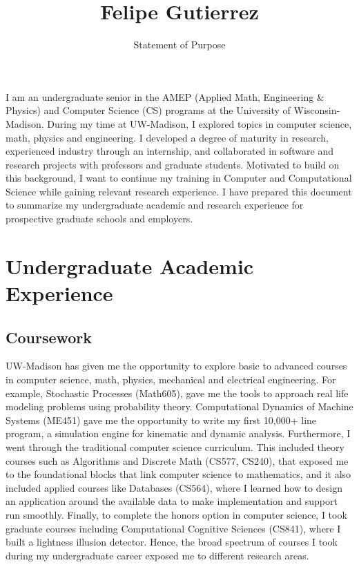 \documentclass{article}
\title{Felipe Gutierrez}
\date{}
\author{Statement of Purpose}
\theoremstyle{definition}
\begin{document}
\maketitle 

I am an undergraduate senior in the AMEP (Applied Math, Engineering \& Physics) and Computer Science (CS) programs at the University of Wisconsin-Madison. During my time at UW-Madison, I explored topics in computer science, math, physics and engineering. I developed a degree of maturity in research, experienced industry through an internship, and collaborated in software and research projects with professors and graduate students. Motivated to build on this background, I want to continue my training in Computer and Computational Science while gaining relevant research experience. I have prepared this document to summarize my undergraduate academic and research experience for prospective graduate schools and employers.

\section*{Undergraduate Academic Experience}

\subsection*{Coursework}
UW-Madison has given me the opportunity to explore basic to advanced courses in computer science, math, physics, mechanical and electrical engineering. For example, Stochastic Processes (Math605), gave me the tools to approach real life modeling problems using probability theory. Computational Dynamics of Machine Systems (ME451) gave me the opportunity to write my first 10,000+ line program, a simulation engine for kinematic and dynamic analysis. Furthermore, I went through the traditional computer science curriculum. This included theory courses such as Algorithms and Discrete Math (CS577, CS240), that exposed me to the foundational blocks that link computer science to mathematics, and it also included applied courses like Databases (CS564), where I learned how to design an application around the available data to make implementation and support run smoothly. Finally, to complete the honors option in computer science, I took graduate courses including Computational Cognitive Sciences (CS841), where I built a lightness illusion detector. Hence, the broad spectrum of courses I took during my undergraduate career exposed me to different research areas. \newline
\end{document}
